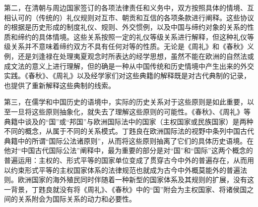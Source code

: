 \documentclass[a4paper, 12pt, openright]{ctexbook}
\begin{document}
第二，在清朝与周边国家签订的各项法律责任和义务中，双方按照具体的情境、互相认可的（传统的）礼仪规则对互市、朝贡和互信的各项条款进行阐释。这些协议的根据是历史形成的制度礼仪、规则、外交惯例，以及中国与缔约对象的关系的性质和缔约的具体情境。这些关系按照一定的礼仪等级关系进行解释，但这种礼仪等级关系并不意味着缔约双方不具有任何对等的性质。无论是《周礼》和《春秋》义例，还是刘逢禄在处理夷夏观念时所表达的经学思想，虽然不能在欧洲的自然法或成文法的意义上进行理解，但的确是一种从中国传统和历史情境中产生出来的外交实践。《春秋》、《周礼》以及经学家们对这些典籍的解释既是对古代典制的记录，也提供了重新解释这些典制的线索。

第三，在儒学和中国历史的语境中，实际的历史关系对于这些原则是如此重要，以至一旦将这些原则抽象化，就失去了理解这些原则的可能性。《春秋》、《周礼》等典籍中谈及的“国”或“邦国”与欧洲国际法中的国家（主权国家或民族国家）是两种不同的概念，从属于不同的关系模式。丁韪良在欧洲国际法的视野中条列中国古代典籍中的所谓“国际公法诸原则”，从而将这些原则抽离了它们的具体历史语境。在他对“中国古代国际公法”阐释中，最为重要的部分是对“国”和“国际”这两个概念的普遍运用：主权的、形式平等的国家单位变成了贯穿古今中外的普遍存在，从而用以约束形式平等的主权国家体系的法律规范也就成为古今中外概莫能外的普遍法则。欧洲国家的海外殖民同时伴随着一种新型的国家体系及其规则的扩展，没有这一背景，丁韪良就没有将《周礼》、《春秋》中的“国”附会为主权国家、将诸侯国之间的关系附会为国际关系的动力和必要性。
\end{document}
